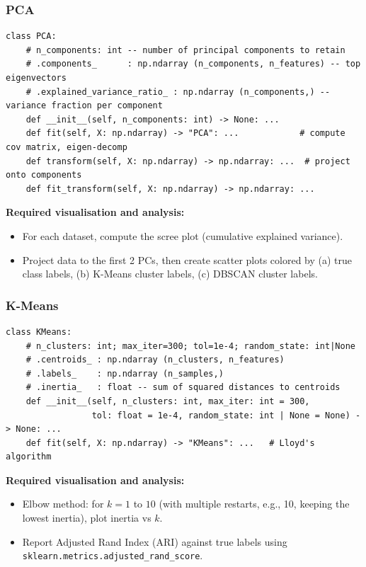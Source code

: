 \documentclass[11pt,a4paper]{article}
\begin{document}
\subsubsection{PCA}
\begin{lstlisting}[style=python, label=lst:pca]
class PCA:
    # n_components: int -- number of principal components to retain
    # .components_      : np.ndarray (n_components, n_features) -- top eigenvectors
    # .explained_variance_ratio_ : np.ndarray (n_components,) -- variance fraction per component
    def __init__(self, n_components: int) -> None: ...
    def fit(self, X: np.ndarray) -> "PCA": ...            # compute cov matrix, eigen-decomp
    def transform(self, X: np.ndarray) -> np.ndarray: ...  # project onto components
    def fit_transform(self, X: np.ndarray) -> np.ndarray: ...
\end{lstlisting}
\vspace{0.4em}
\textbf{Required visualisation and analysis:}
\begin{itemize}
  \item For each dataset, compute the scree plot (cumulative explained variance).
  \item Project data to the first 2 PCs, then create scatter plots colored by (a) true class labels, (b) K-Means cluster labels, (c) DBSCAN cluster labels.
\end{itemize}

\subsubsection{K-Means}
\begin{lstlisting}[style=python, label=lst:kmeans]
class KMeans:
    # n_clusters: int; max_iter=300; tol=1e-4; random_state: int|None
    # .centroids_ : np.ndarray (n_clusters, n_features)
    # .labels_    : np.ndarray (n_samples,)
    # .inertia_   : float -- sum of squared distances to centroids
    def __init__(self, n_clusters: int, max_iter: int = 300,
                 tol: float = 1e-4, random_state: int | None = None) -> None: ...
    def fit(self, X: np.ndarray) -> "KMeans": ...   # Lloyd's algorithm
\end{lstlisting}
\vspace{0.4em}
\textbf{Required visualisation and analysis:}
\begin{itemize}
  \item Elbow method: for $k = 1$ to $10$ (with multiple restarts, e.g., 10, keeping the lowest inertia), plot inertia vs $k$.
  \item Report Adjusted Rand Index (ARI) against true labels using \texttt{sklearn.metrics.adjusted\_rand\_score}.
\end{itemize}
\end{document}

